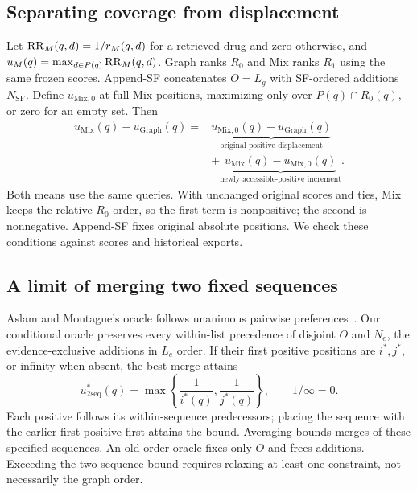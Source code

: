 \subsection{Separating coverage from displacement}
\label{sec:decomposition}
Let $\operatorname{RR}_M(q,d)=1/r_M(q,d)$ for a retrieved drug and zero otherwise, and $u_M(q)=\max_{d\in P(q)}\operatorname{RR}_M(q,d)$. Graph ranks $R_0$ and Mix ranks $R_1$ using the same frozen scores. Append-SF concatenates $O=L_g$ with SF-ordered additions $N_{\mathrm{SF}}$. Define $u_{\mathrm{Mix},0}$ at full Mix positions, maximizing only over $P(q)\cap R_0(q)$, or zero for an empty set. Then
\begin{align}
u_{\mathrm{Mix}}(q)-u_{\mathrm{Graph}}(q)
={}&\underbrace{u_{\mathrm{Mix},0}(q)-u_{\mathrm{Graph}}(q)}_{\text{original-positive displacement}}\nonumber\\
&+\underbrace{u_{\mathrm{Mix}}(q)-u_{\mathrm{Mix},0}(q)}_{\text{newly accessible-positive increment}}.
\label{eq:decomposition}
\end{align}
Both means use the same queries. With unchanged original scores and ties, Mix keeps the relative $R_0$ order, so the first term is nonpositive; the second is nonnegative. Append-SF fixes original absolute positions. We check these conditions against scores and historical exports.

\subsection{A limit of merging two fixed sequences}
\label{sec:bound}
Aslam and Montague's oracle follows unanimous pairwise preferences~\cite{metasearch}. Our conditional oracle preserves every within-list precedence of disjoint $O$ and $N_e$, the evidence-exclusive additions in $L_e$ order. If their first positive positions are $i^*,j^*$, or infinity when absent, the best merge attains
\begin{equation}
u_{\mathrm{2seq}}^*(q)=\max\left\{\frac{1}{i^*(q)},\frac{1}{j^*(q)}\right\},\qquad 1/\infty=0.
\label{eq:bound}
\end{equation}
Each positive follows its within-sequence predecessors; placing the sequence with the earlier first positive first attains the bound. Averaging bounds merges of these specified sequences. An old-order oracle fixes only $O$ and frees additions. Exceeding the two-sequence bound requires relaxing at least one constraint, not necessarily the graph order.
